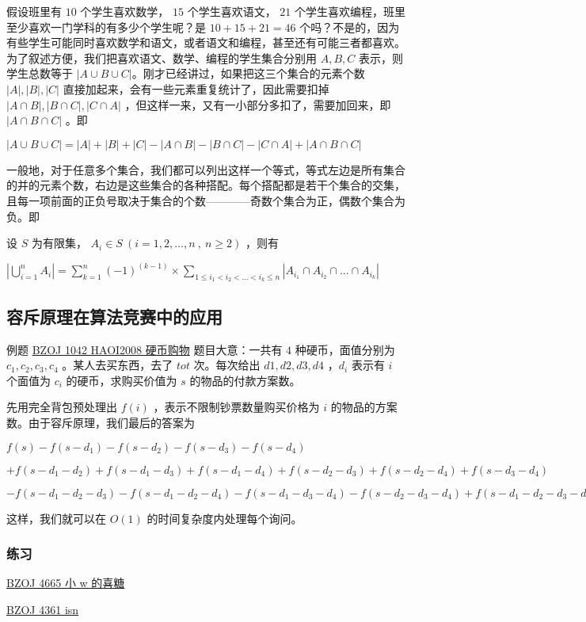 
假设班里有 $10$ 个学生喜欢数学， $15$ 个学生喜欢语文， $21$ 个学生喜欢编程，班里至少喜欢一门学科的有多少个学生呢？是 $10+15+21=46$ 个吗？不是的，因为有些学生可能同时喜欢数学和语文，或者语文和编程，甚至还有可能三者都喜欢。为了叙述方便，我们把喜欢语文、数学、编程的学生集合分别用 $A,B,C$ 表示，则学生总数等于 $|A\cup B\cup C|$。刚才已经讲过，如果把这三个集合的元素个数 $|A|,|B|,|C|$ 直接加起来，会有一些元素重复统计了，因此需要扣掉 $|A\cap B|,|B\cap C|,|C\cap A|$ ，但这样一来，又有一小部分多扣了，需要加回来，即 $|A\cap B\cap C|$ 。即

$|A\cup B\cup C|=|A|+|B|+|C|-|A\cap B|-|B\cap C|-|C\cap A|+|A\cap B\cap C|$

一般地，对于任意多个集合，我们都可以列出这样一个等式，等式左边是所有集合的并的元素个数，右边是这些集合的各种搭配。每个搭配都是若干个集合的交集，且每一项前面的正负号取决于集合的个数————奇数个集合为正，偶数个集合为负。即

设 $S$ 为有限集， $A_i\in S~(i=1,2,...,n~,~n\ge 2)$ ，则有

$| \bigcup_{i=1}^n A_i | =\sum_{k=1}^n (-1)^{(k-1)} \times \sum_{1\le i_1<i_2<...<i_k\le n} |A_{i_1}\cap A_{i_2} \cap ...\cap A_{i_k}|$

\subsection{容斥原理在算法竞赛中的应用}

\begin{NOTE}{例题 \href{https://www.lydsy.com/JudgeOnline/problem.php?id=1042}{BZOJ 1042 HAOI2008 硬币购物}}{}
题目大意：一共有 $4$ 种硬币，面值分别为 $c_1,c_2,c_3,c_4$ 。某人去买东西，去了 $tot$ 次。每次给出 $d1,d2,d3,d4$ ，$d_i$ 表示有 $i$ 个面值为 $c_i$ 的硬币，求购买价值为 $s$ 的物品的付款方案数。

\end{NOTE}


先用完全背包预处理出 $f(i)$ ，表示不限制钞票数量购买价格为 $i$ 的物品的方案数。由于容斥原理，我们最后的答案为

$f(s)-f(s-d_1)-f(s-d_2)-f(s-d_3)-f(s-d_4)$

$+f(s-d_1-d_2)+f(s-d_1-d_3)+f(s-d_1-d_4)+f(s-d_2-d_3)+f(s-d_2-d_4)+f(s-d_3-d_4)$

$-f(s-d_1-d_2-d_3)-f(s-d_1-d_2-d_4)-f(s-d_1-d_3-d_4)-f(s-d_2-d_3-d_4)+f(s-d_1-d_2-d_3-d_4)$

这样，我们就可以在 $O(1)$ 的时间复杂度内处理每个询问。

\subsubsection{练习}

\href{https://www.lydsy.com/JudgeOnline/problem.php?id=4665}{BZOJ 4665 小 w 的喜糖}

\href{https://www.lydsy.com/JudgeOnline/problem.php?id=4361}{BZOJ 4361 isn}
